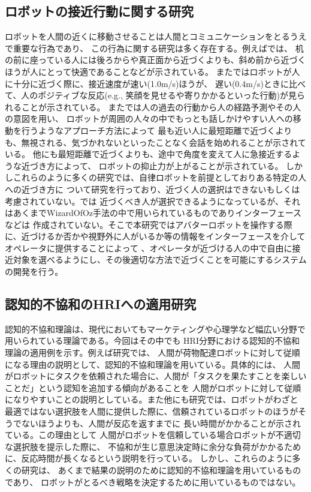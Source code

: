 \documentclass{kuisthesis}
\begin{document}
\subsection{ロボットの接近行動に関する研究}
ロボットを人間の近くに移動させることは人間とコミュニケーションをとるうえで重要な行為であり、
この行為に関する研究は多く存在する。例えば\cite{woods2006methodological}では、
机の前に座っている人には後ろからや真正面から近づくよりも、斜め前から近づくほうが人にとって快適であることなどが示されている。
また\cite{joosse2021making}ではロボットが人に十分に近づく際に、接近速度が速い(1.0m/s)ほうが、
遅い(0.4m/s)ときに比べて、人のポジティブな反応(e.g., 笑顔を見せるや寄りかかるといった行動)が見られることが示されている。
また\cite{satake2009approach}では人の過去の行動から人の経路予測やその人の意図を用い、
ロボットが周囲の人々の中でもっとも話しかけやすい人への移動を行うようなアプローチ方法によって
最も近い人に最短距離で近づくよりも、無視される、気づかれないといったことなく会話を始めれることが示されている。
他にも最短距離で近づくよりも、途中で角度を変えて人に急接近するような近づき方によって、
ロボットの抑止力が上がることが示されている\cite{Mizumaru2019}。
しかしこれらのように多くの研究では、自律ロボットを前提としておりある特定の人への近づき方に
ついて研究を行っており、近づく人の選択はできないもしくは考慮されていない。\cite{Mizumaru2019}では
近づくべき人が選択できるようになっているが、それはあくまでWizardOfOz手法の中で用いられているものでありインターフェースなどは
作成されていない。そこで本研究ではアバターロボットを操作する際に、近づけるか否かや視野外に人がいるか等の情報をインターフェースを介してオペレータに提供することによって
、オペレータが近づける人の中で自由に接近対象を選べるようにし、その後適切な方法で近づくことを可能にするシステムの開発を行う。

\subsection{認知的不協和のHRIへの適用研究}
認知的不協和理論\cite{Festinger1957}は、現代においてもマーケティングや心理学など幅広い分野で用いられている理論である。今回はその中でも
HRI分野における認知的不協和理論の適用例を示す。例えば研究\cite{washburn2022exploring}では、
人間が荷物配達ロボットに対して従順になる理由の説明として、認知的不協和理論を用いている。具体的には、
人間がロボットにタスクを依頼された場合に、人間が「タスクを果たすことを楽しいことだ」という認知を追加する傾向があることを
人間がロボットに対して従順になりやすいことの説明としている。また他にも研究\cite{herse2018you}では、ロボットがわざと
最適ではない選択肢を人間に提供した際に、信頼されているロボットのほうがそうでないほうよりも、人間が反応を返すまでに
長い時間がかかることが示されている。この理由として
人間がロボットを信頼している場合ロボットが不適切な選択肢を提示した際に、
不協和が生じ意思決定時に余分な負荷がかかるために、反応時間が長くなるという説明を行っている。
しかし、これらのように多くの研究は、
あくまで結果の説明のために認知的不協和理論を用いているものであり、
ロボットがとるべき戦略を決定するために用いているものではない。
\end{document}

